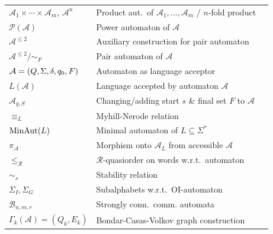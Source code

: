 \begin{longtable}{p{} p{} p{}}
				$\mathcal A_1 \times \cdots \times \mathcal A_m$, $\mathcal A^n$ & Product aut.~of $\mathcal A_1, \ldots, \mathcal A_m$ / $n$-fold product & \pageref{def:product_aut} \\
	$\mathcal P(\mathcal A)$ & Power automaton of $\mathcal A$ & \pageref{def:power_aut} \\
	$\mathcal A^{\le 2}$ & Auxiliary construction for pair automaton & \pageref{def:pair_aut} \\
$\mathcal A^{\le 2} / {\sim_F}$ & Pair automaton of $\mathcal A$ &  \pageref{def:pair_aut} \\	
		$\mathcal A = (Q, \Sigma, \delta, q_0, F)$ & Automaton as language acceptor & \pageref{def:automaton-acceptor} \\
	$L(\mathcal A)$          & Language accepted by automaton $\mathcal A$ & \pageref{def:accepted_lang_aut} \\	
			$\mathcal A_{q,S}$ & Changing/adding start $s$ \& final set $F$ to $\mathcal A$ & \pageref{def:add_start_final} \\	
	$\equiv_L$ & Myhill-Nerode relation & \pageref{def:Nerode} \\
	$\operatorname{MinAut}(L)$ & Minimal automaton of $L \subseteq \Sigma^*$ & \pageref{def:minaut} \\
	$\pi_{\mathcal A}$ & Morphism onto $\mathcal A_L$ from accessible $\mathcal A$ & \pageref{def:Nerode-morphism} \\ 
	$\le_{\mathcal R}$ & $\mathcal R$-quasiorder on words w.r.t.~automaton & \pageref{def:R-quasiorder} \\
	$\sim_s$           & Stability relation & \pageref{def:stability} \\
	$\Sigma_I, \Sigma_G$ & Subalphabets w.r.t.~OI-automaton & \pageref{def:subalphabets_SI} \\	
	$\mathcal B_{n,m, r}$ & Strongly conn.~comm. automata & \pageref{def:grid-aut} \\	
	$\Gamma_k(\mathcal A) = (Q_k, E_k)$ & Bondar-Casas-Volkov graph construction & \pageref{def:Gammakgraphs} \\

\end{longtable}
